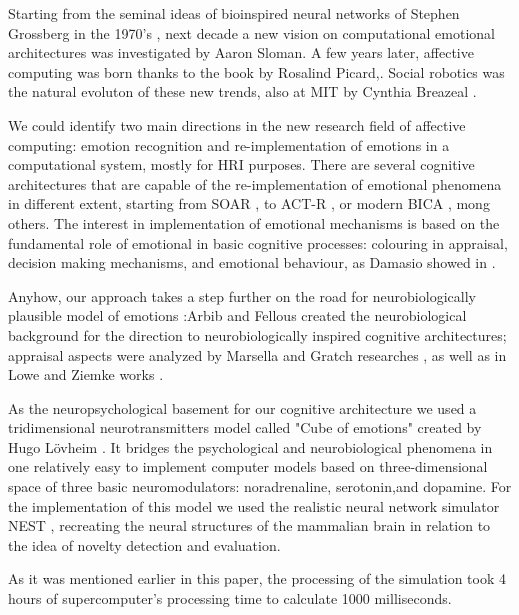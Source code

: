 \documentclass[oribibl]{llncs}
\begin{document}
Starting from the seminal ideas of bioinspired neural networks of Stephen Grossberg in the 1970's \cite{vallverdu2015}, next decade a new vision on computational emotional architectures was  investigated by Aaron Sloman. A few years later, affective computing was born thanks to the book by Rosalind Picard,\cite{picard1997}. Social robotics was the natural evoluton of these new trends, also at MIT by Cynthia Breazeal \cite{breazeal2002}.

We could identify two main directions in the new research field of affective computing: emotion recognition and re-implementation of emotions in a computational system, mostly for HRI purposes. There are several cognitive architectures that are capable of the re-implementation of emotional phenomena in different extent, starting from SOAR \cite{laird2008}, to ACT-R \cite{harrison2002}, or modern BICA \cite{samsonovich2013}, mong others.
The interest in implementation of emotional mechanisms is based on the fundamental role of emotional in basic cognitive processes: colouring in appraisal, decision making mechanisms, and emotional behaviour, as Damasio showed in \cite{damasio1994}. 

Anyhow, our approach takes a step further on the road for neurobiologically plausible model of emotions \cite{bica2015neucogar}:Arbib and Fellous \cite{neuromodulatory, fellous2004} created the neurobiological background for the direction to neurobiologically inspired cognitive architectures;
appraisal aspects were analyzed by Marsella and Gratch researches \cite{marsella2010, marsella2003, gratch2005}, as well as in Lowe and Ziemke works
\cite{on_role_of_emotion, roleOfReinforcement}.

As the neuropsychological basement for our cognitive architecture we used a tridimensional neurotransmitters model called "Cube of emotions" created by Hugo L\"{o}vheim \cite{lovheim2012}. It bridges the psychological and neurobiological phenomena in one relatively easy to implement computer models based on three-dimensional space of three basic neuromodulators: noradrenaline, serotonin,and dopamine.
For the implementation of this model we used the realistic neural network simulator NEST \cite{Gewaltig:NEST}, recreating the neural structures of the mammalian brain in relation to the idea of novelty detection and evaluation. 

As it was mentioned earlier in this paper, the processing of the simulation took 4 hours of supercomputer's processing time to calculate 1000 milliseconds\cite{kugurakova2016}.
\end{document}
